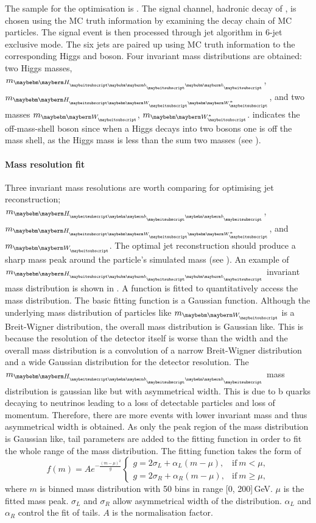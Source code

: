 The sample for the optimisation is \eeToHH. The signal channel, hadronic decay of \eeToHHbbWWHad, is chosen using the MC truth information by  examining the decay chain of MC particles. The signal event is then processed through \kt jet algorithm  in 6-jet exclusive mode. The six jets are paired up using  MC truth information to the corresponding Higgs and \PW boson. Four invariant mass distributions are obtained: two Higgs masses, $m_{\Hbb}$, $m_{\HWW}$, and two \PW masses $m_{\PW}$, $m_{\W*}$. \W* indicates the off-mass-shell \PW boson since when a Higgs decays into two \PW bosons one \PW is off the mass shell, as the Higgs mass is less than the sum two \PW masses (see ).

\paragraph{Mass resolution fit}
Three invariant mass resolutions are worth comparing for optimising jet reconstruction;  $m_{\Hbb}$, $m_{\HWW}$, and $m_{\PW}$. The optimal jet reconstruction should produce a sharp mass peak around the particle's simulated mass (see ). An example of $m_{\Hbb}$ invariant mass distribution is shown in . A function is fitted to quantitatively access the mass distribution. The basic fitting function is a Gaussian function. Although the underlying mass distribution of particles like $m_{\PW}$ is a Breit-Wigner distribution, the overall mass distribution is Gaussian like. This is because the resolution of the detector itself is worse than the \PW width and the overall mass distribution is a convolution of a narrow \PW Breit-Wigner distribution and a wide Gaussian distribution for the detector resolution. The $m_{\Hbb}$  mass distribution is gaussian like but with asymmetrical width. This is due to b quarks decaying to neutrinos leading to a loss of detectable particles and loss of momentum. Therefore, there are more events with lower invariant mass and thus asymmetrical width is obtained. As only the peak region of the mass distribution is Gaussian like, tail parameters are added to the fitting function in order to fit the whole range of the mass distribution. The fitting function takes the form of
\begin{equation}
f(m)=A e^{- \frac{(m - \mu)^2}{g}}
\begin{cases}
  g = 2\sigma_L + \alpha_L(m - \mu), & \text{if}\ m < \mu,\\
  g = 2\sigma_R + \alpha_R(m - \mu), & \text{if}\ m \geqslant \mu,
\end{cases}
\end{equation}
where $m$ is binned mass distribution with 50 bins in range [0, 200]\,GeV. $\mu$ is the fitted mass peak. $\sigma_L$ and $\sigma_R$ allow asymmetrical width of the distribution. $\alpha_L$ and  $\alpha_R$  control the fit of tails.  $A$ is the normalisation factor.


